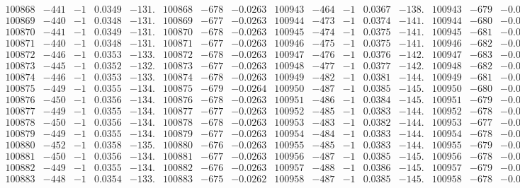 \documentclass[11pt,reqno,a4letter]{article}
\numberwithin{figure}{section}
\numberwithin{table}{section}
\theoremstyle{plain}
\numberwithin{theorem}{section}
\theoremstyle{definition}
\begin{document}
\begin{table}[ht!]
\begin{equation*}
{\begin{array}{ccccc|ccc||ccccc|ccc}
100868 & -441 & -1 & 0.0349 & -131. & 100868 & -678 & -0.0263 & 100943 & -464 & -1 & 0.0367 & -138. & 100943 & -679 & -0.0264  \\
100869 & -440 & -1 & 0.0348 & -131. & 100869 & -677 & -0.0263 & 100944 & -473 & -1 & 0.0374 & -141. & 100944 & -680 & -0.0264  \\
100870 & -441 & -1 & 0.0349 & -131. & 100870 & -678 & -0.0263 & 100945 & -474 & -1 & 0.0375 & -141. & 100945 & -681 & -0.0264  \\
100871 & -440 & -1 & 0.0348 & -131. & 100871 & -677 & -0.0263 & 100946 & -475 & -1 & 0.0375 & -141. & 100946 & -682 & -0.0265  \\
100872 & -446 & -1 & 0.0353 & -133. & 100872 & -678 & -0.0263 & 100947 & -476 & -1 & 0.0376 & -142. & 100947 & -683 & -0.0265  \\
100873 & -445 & -1 & 0.0352 & -132. & 100873 & -677 & -0.0263 & 100948 & -477 & -1 & 0.0377 & -142. & 100948 & -682 & -0.0265  \\
100874 & -446 & -1 & 0.0353 & -133. & 100874 & -678 & -0.0263 & 100949 & -482 & -1 & 0.0381 & -144. & 100949 & -681 & -0.0264  \\
100875 & -449 & -1 & 0.0355 & -134. & 100875 & -679 & -0.0264 & 100950 & -487 & -1 & 0.0385 & -145. & 100950 & -680 & -0.0264  \\
100876 & -450 & -1 & 0.0356 & -134. & 100876 & -678 & -0.0263 & 100951 & -486 & -1 & 0.0384 & -145. & 100951 & -679 & -0.0264  \\
100877 & -449 & -1 & 0.0355 & -134. & 100877 & -677 & -0.0263 & 100952 & -485 & -1 & 0.0383 & -144. & 100952 & -678 & -0.0263  \\
100878 & -450 & -1 & 0.0356 & -134. & 100878 & -678 & -0.0263 & 100953 & -483 & -1 & 0.0382 & -144. & 100953 & -677 & -0.0263  \\
100879 & -449 & -1 & 0.0355 & -134. & 100879 & -677 & -0.0263 & 100954 & -484 & -1 & 0.0383 & -144. & 100954 & -678 & -0.0263  \\
100880 & -452 & -1 & 0.0358 & -135. & 100880 & -676 & -0.0263 & 100955 & -485 & -1 & 0.0383 & -144. & 100955 & -679 & -0.0264  \\
100881 & -450 & -1 & 0.0356 & -134. & 100881 & -677 & -0.0263 & 100956 & -487 & -1 & 0.0385 & -145. & 100956 & -678 & -0.0263  \\
100882 & -449 & -1 & 0.0355 & -134. & 100882 & -676 & -0.0263 & 100957 & -488 & -1 & 0.0386 & -145. & 100957 & -679 & -0.0264  \\
100883 & -448 & -1 & 0.0354 & -133. & 100883 & -675 & -0.0262 & 100958 & -487 & -1 & 0.0385 & -145. & 100958 & -678 & -0.0263  \\

\end{array}}
\end{equation*}
\end{table}
\end{document}
